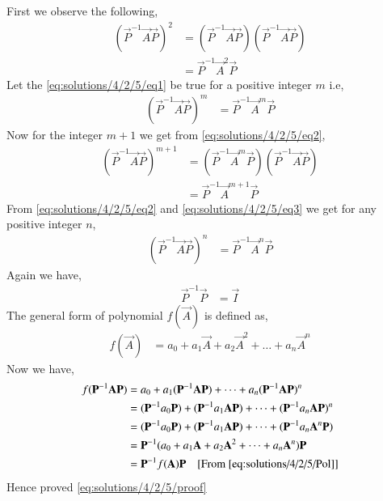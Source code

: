 First we observe the following,
\begin{align}
(\vec{P}^{-1}\vec{A}\vec{P})^2 &= (\vec{P}^{-1}\vec{A}\vec{P})(\vec{P}^{-1}\vec{A}\vec{P})\\
&= \vec{P}^{-1}\vec{A}^2\vec{P}\label{eq:solutions/4/2/5/eq1}
\end{align}
Let the \eqref{eq:solutions/4/2/5/eq1} be true for a positive integer $m$ i.e,
\begin{align}
(\vec{P}^{-1}\vec{A}\vec{P})^m &= \vec{P}^{-1}\vec{A}^m\vec{P}\label{eq:solutions/4/2/5/eq2}
\end{align}
Now for the integer $m+1$ we get from \eqref{eq:solutions/4/2/5/eq2},
\begin{align}
(\vec{P}^{-1}\vec{A}\vec{P})^{m+1} &= (\vec{P}^{-1}\vec{A}^m\vec{P})(\vec{P}^{-1}\vec{A}\vec{P})\\
&= \vec{P}^{-1}\vec{A}^{m+1}\vec{P}\label{eq:solutions/4/2/5/eq3}
\end{align}
From \eqref{eq:solutions/4/2/5/eq2} and \eqref{eq:solutions/4/2/5/eq3} we get for any positive integer $n$,
\begin{align}
(\vec{P}^{-1}\vec{A}\vec{P})^{n} &= \vec{P}^{-1}\vec{A}^n\vec{P} \label{eq:solutions/4/2/5/obs}
\end{align}
Again we have,
\begin{align}
\vec{P}^{-1}\vec{P} &= \vec{I}\label{eq:solutions/4/2/5/Id}
\end{align}
The general form of polynomial $f(\vec{A})$ is defined as,
\begin{align}
f(\vec{A}) &= a_0+a_1\vec{A}+a_2\vec{A}^2+\dots+a_n\vec{A}^n\label{eq:solutions/4/2/5/Pol}
\end{align}
Now we have,
\begin{align}
f(\vec{P}^{-1}\vec{A}\vec{P}) &= a_0+a_1(\vec{P}^{-1}\vec{A}\vec{P})+\dots+a_n(\vec{P}^{-1}\vec{A}\vec{P})^n\\
&= (\vec{P}^{-1}a_0\vec{P})+(\vec{P}^{-1}a_1\vec{A}\vec{P})+\dots+(\vec{P}^{-1}a_n\vec{A}\vec{P})^n\\
&= (\vec{P}^{-1}a_0\vec{P})+(\vec{P}^{-1}a_1\vec{A}\vec{P})+\dots+(\vec{P}^{-1}a_n\vec{A}^n\vec{P})\\
&= \vec{P}^{-1}(a_0+a_1\vec{A}+a_2\vec{A}^2+\dots+a_n\vec{A}^n)\vec{P}\\
&= \vec{P}^{-1}f(\vec{A})\vec{P}\label{eq:solutions/4/2/5/proof} \quad\text{[From \eqref{eq:solutions/4/2/5/Pol}]}
\end{align}
Hence proved \eqref{eq:solutions/4/2/5/proof}
